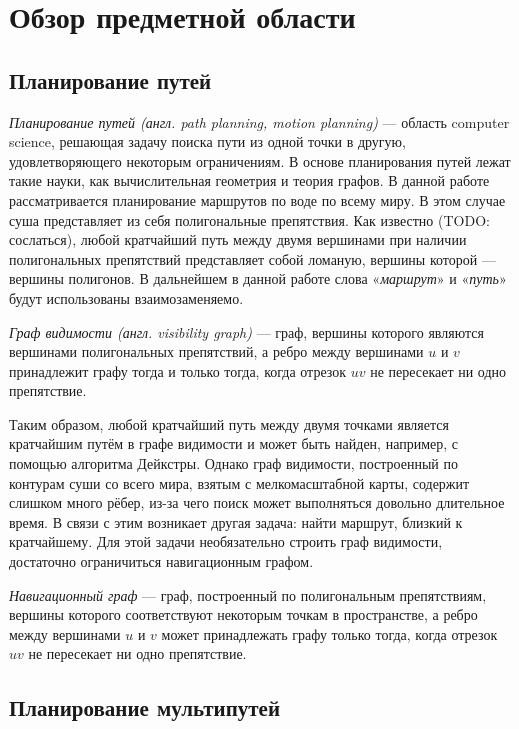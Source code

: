 \chapter{Обзор предметной области}

\FloatBarrier
\section{Планирование путей}

\emph{Планирование путей (англ. path planning, motion planning)} ---
область computer science, решающая задачу поиска пути из одной точки в
другую, удовлетворяющего некоторым ограничениям. В основе
планирования путей лежат такие науки, как вычислительная геометрия
и теория графов. В данной работе рассматривается планирование
маршрутов по воде по всему миру. В этом случае суша представляет из
себя полигональные препятствия. Как известно (TODO: сослаться), любой
кратчайший путь между двумя вершинами при наличии полигональных препятствий
представляет собой ломаную, вершины которой --- вершины полигонов. В
дальнейшем в данной работе слова «\emph{маршрут}» и «\emph{путь}»
будут использованы взаимозаменяемо.

\emph{Граф видимости (англ. visibility graph)} --- граф, вершины
которого являются вершинами полигональных препятствий, а ребро между
вершинами $u$ и $v$ принадлежит графу тогда и только тогда, когда
отрезок $uv$ не пересекает ни одно препятствие.

Таким образом, любой кратчайший путь между двумя точками является
кратчайшим путём в графе видимости и может быть найден, например, с
помощью алгоритма Дейкстры. Однако граф видимости, построенный по
контурам суши со всего мира, взятым с мелкомасштабной карты, содержит
слишком много рёбер, из-за чего поиск может выполняться довольно
длительное время. В связи с этим возникает другая задача: найти
маршрут, близкий к кратчайшему. Для этой задачи необязательно строить
граф видимости, достаточно ограничиться навигационным графом.

\emph{Навигационный граф} --- граф, построенный по полигональным
препятствиям, вершины которого соответствуют некоторым точкам в
пространстве, а ребро между вершинами $u$ и $v$ может принадлежать графу только
тогда, когда отрезок $uv$ не пересекает ни одно препятствие.

\FloatBarrier
\section{Планирование мультипутей}

